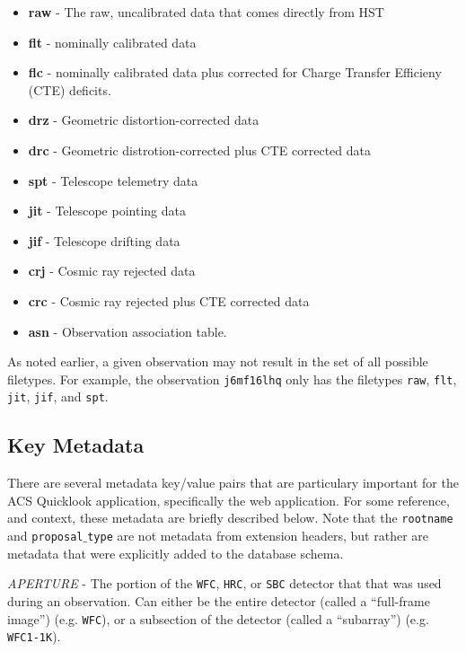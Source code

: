 \documentclass[10pt,journal,compsoc]{IEEEtran}
\begin{document}
\begin{itemize}
  \item \textbf{raw} - The raw, uncalibrated data that comes directly from HST
  \item \textbf{flt} - nominally calibrated data
  \item \textbf{flc} - nominally calibrated data plus corrected for Charge Transfer Efficieny (CTE) deficits.
  \item \textbf{drz} - Geometric distortion-corrected data
  \item \textbf{drc} - Geometric distrotion-corrected plus CTE corrected data
  \item \textbf{spt} - Telescope telemetry data
  \item \textbf{jit} - Telescope pointing data
  \item \textbf{jif} - Telescope drifting data
  \item \textbf{crj} - Cosmic ray rejected data
  \item \textbf{crc} - Cosmic ray rejected plus CTE corrected data
  \item \textbf{asn} - Observation association table.
\end{itemize}

As noted earlier, a given observation may not result in the set of all possible filetypes.
For example, the observation \texttt{j6mf16lhq} only has the filetypes \texttt{raw},
\texttt{flt}, \texttt{jit}, \texttt{jif}, and \texttt{spt}.

\subsection{Key Metadata}

There are several metadata key/value pairs that are particulary important for the
ACS Quicklook application, specifically the web application.  For some reference,
and context, these metadata are briefly described below.  Note that the \texttt{rootname}
and \texttt{proposal$\_$type} are not metadata from extension headers, but rather are
metadata that were explicitly added to the database schema.\newline

\textit{APERTURE} - The portion of the \texttt{WFC}, \texttt{HRC}, or \texttt{SBC} detector that
that was used during an observation.  Can either be the entire detector (called a ``full-frame
image'') (e.g. \texttt{WFC}), or a subsection of the detector (called a ``subarray'') (e.g.
\texttt{WFC1-1K}).\\
\end{document}
